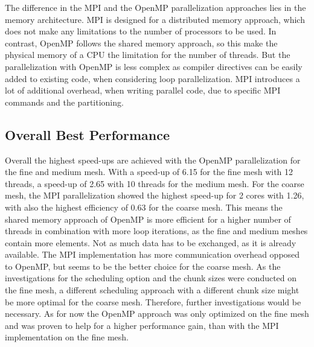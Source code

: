 The difference in the MPI and the OpenMP parallelization approaches lies in the memory architecture. MPI is designed for a distributed memory approach, which does not make any limitations to the number of processors to be used. In contrast, OpenMP follows the shared memory approach, so this make the physical memory of a CPU the limitation for the number of threads. But the parallelization with OpenMP is less complex as compiler directives can be easily added to existing code, when considering loop parallelization. MPI introduces a lot of additional overhead, when writing parallel code, due to specific MPI commands and the partitioning.

\subsection{Overall Best Performance}

Overall the highest speed-ups are achieved with the OpenMP parallelization for the fine and medium mesh. With a speed-up of 6.15 for the fine mesh with 12 threads, a speed-up of 2.65 with 10 threads for the medium mesh. For the coarse mesh, the MPI parallelization showed the highest speed-up for 2 cores with 1.26, with also the highest efficiency of 0.63 for the coarse mesh. 
This means the shared memory approach of OpenMP is more efficient for a higher number of threads in combination with more loop iterations, as the fine and medium meshes contain more elements. Not as much data has to be exchanged, as it is already available. The MPI implementation has more communication overhead opposed to OpenMP, but seems to be the better choice for the coarse mesh. As the investigations for the scheduling option and the chunk sizes were conducted on the fine mesh, a different scheduling approach with a different chunk size might be more optimal for the coarse mesh. Therefore, further investigations would be necessary. As for now the OpenMP approach was only optimized on the fine mesh and was proven to help for a higher performance gain, than with the MPI implementation on the fine mesh. 
